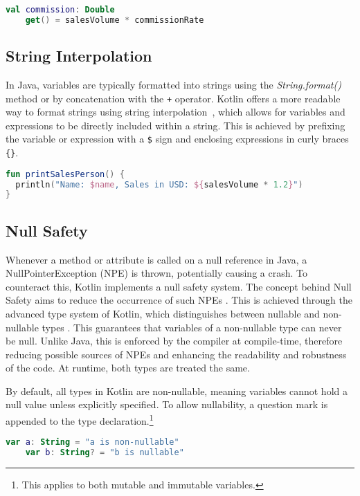 \documentclass[a4paper, 11pt]{article}
\begin{document}
\begin{lstlisting}[language=Kotlin,title={Computed Property}]
  val commission: Double
    get() = salesVolume * commissionRate
\end{lstlisting}
\subsection{String Interpolation}
In Java, variables are typically formatted into strings using the \textit{String.format()} method or by concatenation with the \texttt{+} operator.
Kotlin offers a more readable way to format strings using string interpolation~\cite{string-concatenation}, which allows for variables and expressions to be directly included within a string.
This is achieved by prefixing the variable or expression with a \texttt{\$} sign and enclosing expressions in curly braces \texttt{\{\}}.

\begin{lstlisting}[language=Kotlin,title={String Interpolation}]
fun printSalesPerson() {
  println("Name: $name, Sales in USD: ${salesVolume * 1.2}")
}
\end{lstlisting}

\subsection{Null Safety}
  Whenever a method or attribute is called on a null reference in Java, a NullPointerException (NPE) is thrown, potentially causing a crash. To counteract this, Kotlin implements a null safety system. The concept behind Null Safety aims to reduce the occurrence of such NPEs \cite{nullsafety}. This is achieved through the advanced type system of Kotlin, which distinguishes between nullable and non-nullable types \cite{nullsafety-nullable-types}. This guarantees that variables of a non-nullable type can never be null. Unlike Java, this is enforced by the compiler at compile-time, therefore reducing possible sources of NPEs and enhancing the readability and robustness of the code. At runtime, both types are treated the same.
  
  By default, all types in Kotlin are non-nullable, meaning variables cannot hold a null value unless explicitly specified. To allow nullability, a question mark is appended to the type declaration.\footnote{This applies to both mutable and immutable variables.}

  \begin{lstlisting}[language=Kotlin]
    var a: String = "a is non-nullable"
    var b: String? = "b is nullable"
  \end{lstlisting}
  
\end{document}
